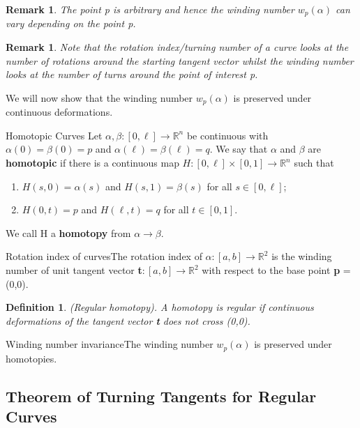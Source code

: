 \documentclass[twoside]{article}
\newtheorem{definition}[theorem]{Definition}
\newtheorem{remark}[theorem]{Remark}
\begin{document}
\begin{remark}The point p is arbitrary and hence the winding number $w_p(\alpha)$ can vary depending on the point p.
\end{remark}

\begin{remark}Note that the rotation index/turning number of a curve looks at the number of rotations around the starting tangent vector whilst the winding number looks at the number of turns around the point of interest p.
\end{remark}

We will now show that the winding number $w_p(\alpha)$ is preserved under continuous deformations.
\begin{definition_exam}{Homotopic Curves}{} Let $\alpha, \beta: [0, \ell] \rightarrow \mathbb{R}^n$ be continuous with $\alpha(0) = \beta(0) = p$ and $\alpha(\ell) = \beta(\ell) = q$. We say that $\alpha$ and $\beta$ are \textbf{homotopic} if there is a continuous map $H: [0, \ell] \times [0,1] \rightarrow \mathbb{R}^n$ such that 
\begin{enumerate}
    \item $H(s,0) = \alpha(s)$ and $H(s,1) = \beta(s)$ for all $s \in [0, \ell]$;
    \item $H(0,t) = p$ and $H(\ell, t) = q$ for all $t \in [0,1].$
\end{enumerate}
We call H a \textbf{homotopy} from $\alpha \rightarrow \beta$.
\end{definition_exam}

\begin{proposition_exam}{Rotation index of curves}{}The rotation index of $\alpha: [a,b] \rightarrow \mathbb{R}^2$ is the winding number of unit tangent vector \textbf{t}$: [a,b] \rightarrow \mathbb{R}^2$ with respect to the base point \textbf{p} = (0,0). 
\end{proposition_exam}

\begin{definition}(Regular homotopy). A homotopy is regular if continuous deformations of the tangent vector \textbf{t} does not cross (0,0).
\end{definition}

\begin{proposition_exam}{Winding number invariance}{}The winding number $w_p(\alpha)$ is preserved under homotopies.
\end{proposition_exam}

\subsection{Theorem of Turning Tangents for Regular Curves}
\end{document}
